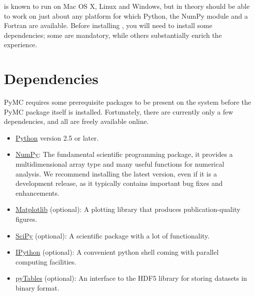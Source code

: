 


 is known to run on Mac OS X, Linux and Windows, but in theory should be 
able to work on just about any platform for which Python, the NumPy module and a Fortran 
are available. Before installing , you will need to install some dependencies; some are mandatory, while others substantially enrich the  experience.



\hypertarget{dependencies}{}
\section*{Dependencies}

PyMC requires some prerequisite packages to be present on the system before the 
PyMC package itself is installed. Fortunately, there are currently only a few 
dependencies, and all are freely available online.
\begin{itemize}
\item {} 
\href{http://www.python.org/.}{Python} version 2.5 or later.

\item {} 
\href{http://www.scipy.org/NumPy}{NumPy}: The fundamental scientific programming package, it provides a 
multidimensional array type and many useful functions for numerical analysis. 
We recommend installing the latest version, even if it is a development release,
as it typically contains important bug fixes and enhancements.

\item {} 
\href{http://matplotlib.sourceforge.net/}{Matplotlib} (optional): A plotting library that produces publication-quality figures.

\item {} 
\href{http://www.scipy.org/}{SciPy} (optional): A scientific package with a lot of functionality.

\item {} 
\href{http://ipython.scipy.org/}{IPython} (optional): A convenient python shell coming with parallel 
computing facilities.

\item {} 
\href{http://www.pytables.org/moin}{pyTables} (optional): An interface to the HDF5 library for storing datasets
in binary format.

\end{itemize}

